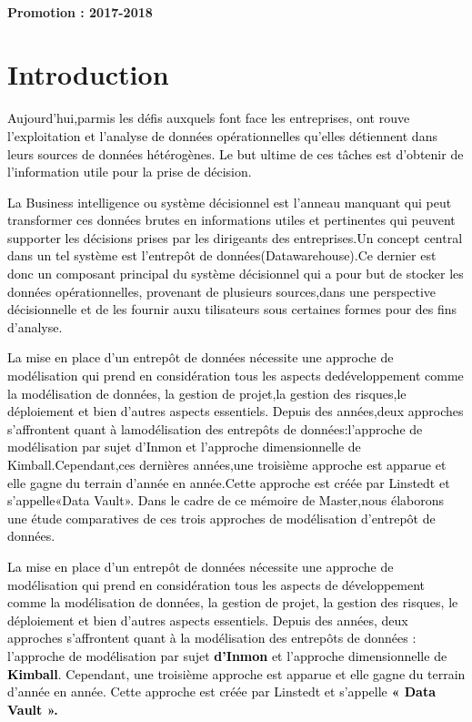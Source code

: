 \documentclass[a4paper,12pt]{report}
\begin{document}
		~~\\
		\vskip 0.3in
		\begin{center}
			\vspace{0.3cm} \textbf{Promotion : 2017-2018}
		\end{center}
	\newpage
		
		
		
		
		\section*{Introduction}
\vspace{1cm}
    



\textcolor{black}{Aujourd’hui,parmis les défis auxquels font face les entreprises, ont rouve l’exploitation et l’analyse de données opérationnelles qu’elles détiennent dans leurs sources de données hétérogènes. Le but ultime de ces tâches est d’obtenir de l’information utile pour la prise de décision.
}

 \textcolor{black}{La Business intelligence ou système décisionnel est l’anneau manquant qui peut transformer ces données brutes en informations utiles et pertinentes qui peuvent supporter les décisions prises par les dirigeants des entreprises.Un concept central dans un tel système est l’entrepôt de données(Datawarehouse).Ce dernier est donc un composant principal du système décisionnel qui a pour but de stocker les données opérationnelles, provenant de plusieurs sources,dans une perspective décisionnelle et de les fournir auxu tilisateurs sous certaines formes pour des fins d’analyse.
 }


\textcolor{black}{La mise en place d’un entrepôt de données nécessite une approche de modélisation qui prend en considération tous les aspects dedéveloppement comme la modélisation de données, la gestion de projet,la gestion des risques,le déploiement et bien d’autres aspects essentiels.
Depuis des années,deux approches s’affrontent quant à lamodélisation des entrepôts de données:l’approche de modélisation par sujet d’Inmon et l’approche dimensionnelle de Kimball.Cependant,ces dernières années,une troisième approche est apparue et elle gagne du terrain d’année en année.Cette approche est créée par Linstedt et s’appelle«Data Vault».
Dans le cadre de ce mémoire de Master,nous élaborons une étude comparatives de ces trois approches de modélisation d’entrepôt de données.}


\textcolor{black}{La mise en place d’un entrepôt de données nécessite une approche de modélisation qui
prend en considération tous les aspects de développement comme la modélisation de données, la
gestion de projet, la gestion des risques, le déploiement et bien d’autres aspects essentiels.
 Depuis des années, deux approches s’affrontent quant à la modélisation des entrepôts de
données : l’approche de modélisation par sujet  \textbf{d’Inmon }et l’approche dimensionnelle de  \textbf{ Kimball}.
Cependant, une troisième approche est apparue et elle gagne du terrain d’année en année. Cette
approche est créée par Linstedt et s’appelle \textbf{ « Data Vault ».}}
\end{document}
